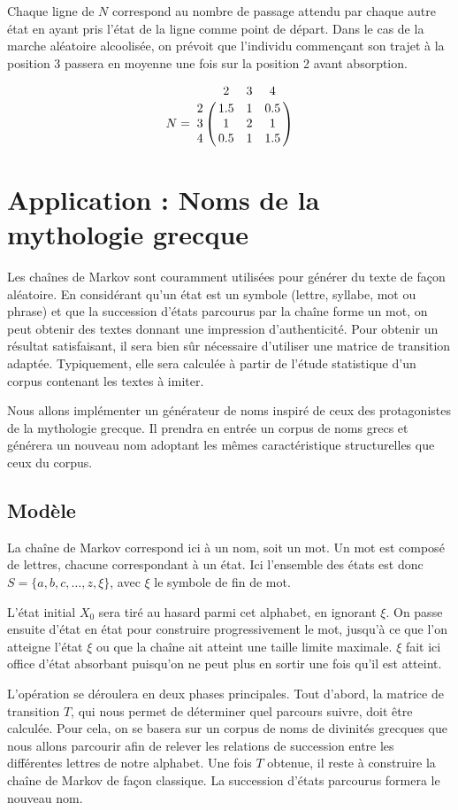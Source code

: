 \documentclass[12pt]{article}
\begin{document}
Chaque ligne de $N$ correspond au nombre de passage attendu par chaque
autre état en ayant pris l'état de la ligne comme point de
départ. Dans le cas de la marche aléatoire alcoolisée, on prévoit que
l'individu commençant son trajet à la position 3 passera en moyenne
une fois sur la position 2 avant absorption.

$$
N =
\bordermatrix{
  & 2 & 3 & 4 \cr
  2 & 1.5 & 1 & 0.5 \cr
  3 & 1 & 2 & 1 \cr
  4 & 0.5 & 1 & 1.5
}
$$

\section{Application : Noms de la mythologie grecque}

Les chaînes de Markov sont couramment utilisées pour générer du texte
de façon aléatoire. En considérant qu'un état est un symbole (lettre,
syllabe, mot ou phrase) et que la succession d'états parcourus par la
chaîne forme un mot, on peut obtenir des textes donnant une impression
d'authenticité. Pour obtenir un résultat satisfaisant, il sera bien
sûr nécessaire d'utiliser une matrice de transition
adaptée. Typiquement, elle sera calculée à partir de l'étude
statistique d'un corpus contenant les textes à imiter.

Nous allons implémenter un générateur de noms inspiré de ceux des
protagonistes de la mythologie grecque. Il prendra en entrée un corpus
de noms grecs et générera un nouveau nom adoptant les mêmes
caractéristique structurelles que ceux du corpus.

\subsection{Modèle}

La chaîne de Markov correspond ici à un nom, soit un mot. Un mot est
composé de lettres, chacune correspondant à un état. Ici l'ensemble
des états est donc $S = \{a, b, c, \dots, z, \xi \}$, avec $\xi$ le
symbole de fin de mot.

L'état initial $X_0$ sera tiré au hasard parmi cet alphabet, en
ignorant $\xi$. On passe ensuite d'état en état pour construire
progressivement le mot, jusqu'à ce que l'on atteigne l'état $\xi$ ou
que la chaîne ait atteint une taille limite maximale. $\xi$ fait ici
office d'état absorbant puisqu'on ne peut plus en sortir une fois
qu'il est atteint.

L'opération se déroulera en deux phases principales. Tout d'abord, la
matrice de transition $T$, qui nous permet de déterminer quel parcours
suivre, doit être calculée. Pour cela, on se basera sur un corpus de
noms de divinités grecques que nous allons parcourir afin de relever
les relations de succession entre les différentes lettres de notre
alphabet. Une fois $T$ obtenue, il reste à construire la chaîne de
Markov de façon classique. La succession d'états parcourus formera le
nouveau nom.
\end{document}
